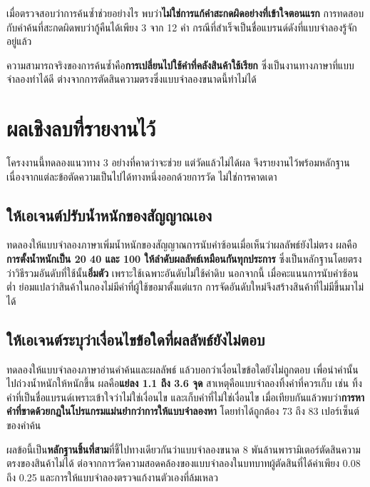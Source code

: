 เมื่อตรวจสอบว่าการค้นซ้ำช่วยอย่างไร พบว่า\textbf{ไม่ใช่การแก้คำสะกดผิดอย่างที่เข้าใจตอนแรก} การทดสอบกับคำค้นที่สะกดผิดพบว่ากู้คืนได้เพียง 3 จาก 12 คำ กรณีที่สำเร็จเป็นชื่อแบรนด์ดังที่แบบจำลองรู้จักอยู่แล้ว

ความสามารถจริงของการค้นซ้ำคือ\textbf{การเปลี่ยนไปใช้คำที่คลังสินค้าใช้เรียก} ซึ่งเป็นงานทางภาษาที่แบบจำลองทำได้ดี ต่างจากการตัดสินความตรงซึ่งแบบจำลองขนาดนี้ทำไม่ได้

\section{ผลเชิงลบที่รายงานไว้}

โครงงานนี้ทดลองแนวทาง 3 อย่างที่คาดว่าจะช่วย แต่วัดแล้วไม่ได้ผล จึงรายงานไว้พร้อมหลักฐาน เนื่องจากแต่ละข้อตัดความเป็นไปได้ทางหนึ่งออกด้วยการวัด ไม่ใช่การคาดเดา

\subsection{ให้เอเจนต์ปรับน้ำหนักของสัญญาณเอง}

ทดลองให้แบบจำลองภาษาเพิ่มน้ำหนักของสัญญาณการนับคำซ้อนเมื่อเห็นว่าผลลัพธ์ยังไม่ตรง ผลคือ\textbf{การตั้งน้ำหนักเป็น 20 40 และ 100 ให้ลำดับผลลัพธ์เหมือนกันทุกประการ} ซึ่งเป็นหลักฐานโดยตรงว่าวิธีรวมอันดับที่ใช้นั้น\textbf{อิ่มตัว} เพราะใช้เฉพาะอันดับไม่ใช้ค่าดิบ นอกจากนี้ เมื่อคะแนนการนับคำซ้อนต่ำ ย่อมแปลว่าสินค้าในกองไม่มีคำที่ผู้ใช้ขอมาตั้งแต่แรก การจัดอันดับใหม่จึงสร้างสินค้าที่ไม่มีขึ้นมาไม่ได้

\subsection{ให้เอเจนต์ระบุว่าเงื่อนไขข้อใดที่ผลลัพธ์ยังไม่ตอบ}

ทดลองให้แบบจำลองภาษาอ่านคำค้นและผลลัพธ์ แล้วบอกว่าเงื่อนไขข้อใดยังไม่ถูกตอบ เพื่อนำคำนั้นไปถ่วงน้ำหนักให้หนักขึ้น ผลคือ\textbf{แย่ลง 1.1 ถึง 3.6 จุด} สาเหตุคือแบบจำลองทิ้งคำที่ควรเก็บ เช่น ทิ้งคำที่เป็นชื่อแบรนด์เพราะเข้าใจว่าไม่ใช่เงื่อนไข และเก็บคำที่ไม่ใช่เงื่อนไข เมื่อเทียบกันแล้วพบว่า\textbf{การหาคำที่ขาดด้วยกฎในโปรแกรมแม่นยำกว่าการให้แบบจำลองหา} โดยทำได้ถูกต้อง 73 ถึง 83 เปอร์เซ็นต์ของคำค้น

ผลข้อนี้เป็น\textbf{หลักฐานชิ้นที่สาม}ที่ชี้ไปทางเดียวกันว่าแบบจำลองขนาด 8 พันล้านพารามิเตอร์ตัดสินความตรงของสินค้าไม่ได้ ต่อจากการวัดความสอดคล้องของแบบจำลองในบทบาทผู้ตัดสินที่ได้ค่าเพียง 0.08 ถึง 0.25 และการให้แบบจำลองตรวจแก้งานตัวเองที่ล้มเหลว

